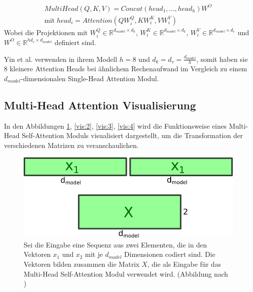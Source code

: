 \documentclass[conference]{IEEEtran}
\begin{document}
\begin{eqnarray} \label{eq:multi_head_attention}
    MultiHead(Q,K,V) = Concat(head_1,...,head_h)W^O \\
    \text{mit} \; head_i = Attention(QW_i^Q , KW_i^K , VW_i^V)
\end{eqnarray}
Wobei die Projektionen mit $W_i^Q \in \mathbb{R}^{d_{model} \times d_k}$, $W_i^K \in \mathbb{R}^{d_{model} \times d_k}$, $W_i^V \in \mathbb{R}^{d_{model} \times d_v}$ und $W^O \in \mathbb{R}^{hd_v \times d_{model}}$ definiert sind. \cite{attention_is_all_you_need}

Yin et al. \cite{attention_is_all_you_need} verwenden in ihrem Modell $h = 8$ und $d_k = d_v = \frac{d_{model}}{h}$, somit haben sie 8 kleinere Attention Heads bei ähnlichem Rechenaufwand im Vergleich zu einem $d_{model}$-dimensionalen Single-Head Attention Modul.

\subsection{Multi-Head Attention Visualisierung}
In den Abbildungen \ref{vis:1}, \ref{vis:2}, \ref{vis:3}, \ref{vis:4} wird die Funktionsweise eines Multi-Head Self-Attention Moduls visualisiert dargestellt, um die Transformation der verschiedenen Matrizen zu veranschaulichen. 

\begin{figure}[htbp]
\centerline{\includegraphics{img/vis1.png}}
\caption{Sei die Eingabe eine Sequenz aus zwei Elementen, die in den Vektoren $x_1$ und $x_2$ mit je $d_{model}$ Dimensionen codiert sind. Die Vektoren bilden zusammen die Matrix $X$, die als Eingabe für das Multi-Head Self-Attention Modul verwendet wird. (Abbildung nach \cite{illustrated_transformer})}
\label{vis:1}
\end{figure}
\end{document}
